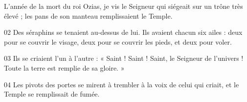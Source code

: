 L’année de la mort du roi Ozias, je vis le Seigneur qui siégeait sur un trône très élevé ; les pans de son manteau remplissaient le Temple.

02 Des séraphins se tenaient au-dessus de lui. Ils avaient chacun six ailes : deux pour se couvrir le visage, deux pour se couvrir les pieds, et deux pour voler.

03 Ils se criaient l’un à l’autre : « Saint ! Saint ! Saint, le Seigneur de l’univers ! Toute la terre est remplie de sa gloire. »

04 Les pivots des portes se mirent à trembler à la voix de celui qui criait, et le Temple se remplissait de fumée.
